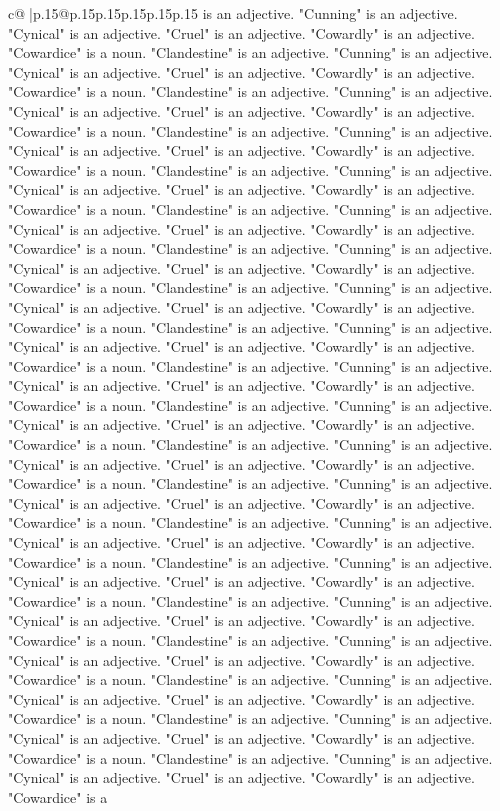 \documentclass{article}
\begin{document}
{\begin{supertabular}{c@{$\;$}|p{.15\linewidth}@{}p{.15\linewidth}p{.15\linewidth}p{.15\linewidth}p{.15\linewidth}p{.15\linewidth}}
{{{is an adjective. "Cunning" is an adjective. "Cynical" is an adjective. "Cruel" is an adjective. "Cowardly" is an adjective. "Cowardice" is a noun. "Clandestine" is an adjective. "Cunning" is an adjective. "Cynical" is an adjective. "Cruel" is an adjective. "Cowardly" is an adjective. "Cowardice" is a noun. "Clandestine" is an adjective. "Cunning" is an adjective. "Cynical" is an adjective. "Cruel" is an adjective. "Cowardly" is an adjective. "Cowardice" is a noun. "Clandestine" is an adjective. "Cunning" is an adjective. "Cynical" is an adjective. "Cruel" is an adjective. "Cowardly" is an adjective. "Cowardice" is a noun. "Clandestine" is an adjective. "Cunning" is an adjective. "Cynical" is an adjective. "Cruel" is an adjective. "Cowardly" is an adjective. "Cowardice" is a noun. "Clandestine" is an adjective. "Cunning" is an adjective. "Cynical" is an adjective. "Cruel" is an adjective. "Cowardly" is an adjective. "Cowardice" is a noun. "Clandestine" is an adjective. "Cunning" is an adjective. "Cynical" is an adjective. "Cruel" is an adjective. "Cowardly" is an adjective. "Cowardice" is a noun. "Clandestine" is an adjective. "Cunning" is an adjective. "Cynical" is an adjective. "Cruel" is an adjective. "Cowardly" is an adjective. "Cowardice" is a noun. "Clandestine" is an adjective. "Cunning" is an adjective. "Cynical" is an adjective. "Cruel" is an adjective. "Cowardly" is an adjective. "Cowardice" is a noun. "Clandestine" is an adjective. "Cunning" is an adjective. "Cynical" is an adjective. "Cruel" is an adjective. "Cowardly" is an adjective. "Cowardice" is a noun. "Clandestine" is an adjective. "Cunning" is an adjective. "Cynical" is an adjective. "Cruel" is an adjective. "Cowardly" is an adjective. "Cowardice" is a noun. "Clandestine" is an adjective. "Cunning" is an adjective. "Cynical" is an adjective. "Cruel" is an adjective. "Cowardly" is an adjective. "Cowardice" is a noun. "Clandestine" is an adjective. "Cunning" is an adjective. "Cynical" is an adjective. "Cruel" is an adjective. "Cowardly" is an adjective. "Cowardice" is a noun. "Clandestine" is an adjective. "Cunning" is an adjective. "Cynical" is an adjective. "Cruel" is an adjective. "Cowardly" is an adjective. "Cowardice" is a noun. "Clandestine" is an adjective. "Cunning" is an adjective. "Cynical" is an adjective. "Cruel" is an adjective. "Cowardly" is an adjective. "Cowardice" is a noun. "Clandestine" is an adjective. "Cunning" is an adjective. "Cynical" is an adjective. "Cruel" is an adjective. "Cowardly" is an adjective. "Cowardice" is a noun. "Clandestine" is an adjective. "Cunning" is an adjective. "Cynical" is an adjective. "Cruel" is an adjective. "Cowardly" is an adjective. "Cowardice" is a noun. "Clandestine" is an adjective. "Cunning" is an adjective. "Cynical" is an adjective. "Cruel" is an adjective. "Cowardly" is an adjective. "Cowardice" is a noun. "Clandestine" is an adjective. "Cunning" is an adjective. "Cynical" is an adjective. "Cruel" is an adjective. "Cowardly" is an adjective. "Cowardice" is a noun. "Clandestine" is an adjective. "Cunning" is an adjective. "Cynical" is an adjective. "Cruel" is an adjective. "Cowardly" is an adjective. "Cowardice" is a }}}
\end{supertabular}}
\end{document}
